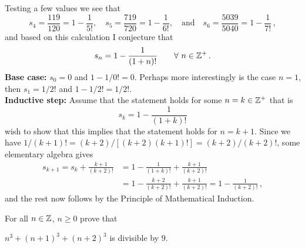 \documentclass[a4paper, english, 12pt]{article} %
\begin{document}
\begin{answer}
  Testing a few values we see that
  \begin{equation*}
    s_4 = \frac{119}{120} = 1 - \frac{1}{5!}, \quad 
    s_5 = \frac{719}{720} = 1 - \frac{1}{6!}, \quad \text{and} \quad
    s_6 = \frac{5039}{5040} = 1 - \frac{1}{7!}\,,
  \end{equation*}
  and based on this calculation I conjecture that
  \begin{equation*}
    s_n = 1 - \frac{1}{(1+n)!} \qquad \forall \ n \in \mathbb{Z}^+\,.
  \end{equation*}
  \textbf{Base case:} $s_0 = 0$ and $1 - 1/0! = 0$. Perhaps more interestingly
  is the case $n=1$, then $s_1 = 1/2!$ and $1 - 1/2! = 1/2!$. \\
  \textbf{Inductive step:} Assume that the statement holds for some $n = k \in
  \mathbb{Z}^+$ that is
  \begin{equation*}
    s_k = 1 - \frac{1}{(1+k)!}
  \end{equation*}
  wish to show that this implies that the statement holds for $n = k + 1$. Since
  we have $1/(k+1)! = (k+2)/[(k+2)(k+1)!] = (k+2)/(k+2)!$, some elementary algebra gives
  \begin{align*}
    s_{k+1}   = s_{k} + \frac{k+1}{(k+2)!} 
             & = 1 - \frac{1}{(1+k)!} + \frac{k+1}{(k+2)!} \\ 
             & = 1 - \frac{k+2}{(k+2)!} + \frac{k+1}{(k+2)!}
             = 1 - \frac{1}{(k+2)!}\,,
  \end{align*}
  and the rest now follows by the Principle of Mathematical Induction.
\end{answer}


\begin{problem}
  For all $n \in \mathbb{Z}$, $n \geq 0$ prove that
  \begin{subproblem}[4]
    $n^3 + (n+1)^3 + (n + 2)^3$ is divisible by $9$.
  \end{subproblem}
\end{problem}
\end{document}
